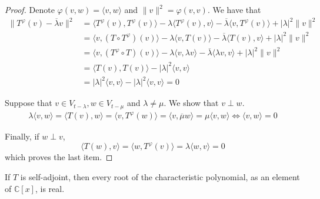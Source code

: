 \begin{proof}
  Denote $\varphi(v, w) = \langle v, w \rangle$ and $\| v \|^2 = \varphi(v,v)$. We have that 
  \begin{equation*}
    \begin{aligned}
      \| T^\varphi(v) - \overline{\lambda} v \|^2 & = \langle T^\varphi(v), T^\varphi(v) \rangle - \lambda \langle T^\varphi(v), v \rangle - \overline{\lambda} \langle v, T^\varphi(v) \rangle + |\lambda|^2 \| v \|^2 \\
      &= \langle v, (T \circ T^\varphi)(v) \rangle - \lambda \langle v, T(v) \rangle - \overline{\lambda} \langle T(v), v \rangle + |\lambda|^2 \| v \|^2 \\
      &= \langle v, (T^\varphi \circ T)(v) \rangle - \lambda \langle v, \lambda v \rangle - \overline{\lambda} \langle \lambda v, v \rangle + |\lambda|^2 \| v \|^2 \\
      &= \langle T(v), T(v) \rangle - |\lambda|^2 \langle v, v \rangle \\ 
      &= |\lambda|^2 \langle v, v \rangle - |\lambda|^2 \langle v, v \rangle = 0
    \end{aligned}
  \end{equation*}

  Suppose that $v \in V_{t-\lambda}, w \in V_{t - \mu}$ and $\lambda \neq \mu$. We show that $v \perp w$.
  \begin{equation*}
    \begin{aligned}
      \lambda \langle v, w \rangle = \langle T(v), w \rangle = \langle v, T^\varphi(w) \rangle = \langle v, \overline{\mu}w \rangle = \mu \langle v, w \rangle \iff \langle v, w \rangle = 0
    \end{aligned}
  \end{equation*}

  Finally, if $w \perp v$, 
  \[
    \langle T(w), v \rangle = \langle w, T^\varphi(v) \rangle = \lambda \langle w,v \rangle = 0
  \]
  which proves the last item. 
\end{proof}

\begin{lemma}\label{lm:202301051407}
  If $T$ is self-adjoint, then every root of the characteristic polynomial, as an element of $\mathbb{C}[x]$, is real. 
\end{lemma}

